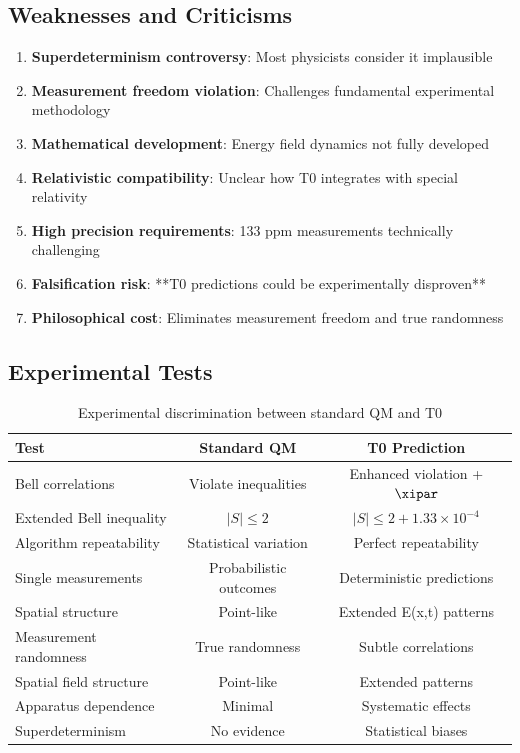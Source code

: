 	\subsection{Weaknesses and Criticisms}
	
	\begin{enumerate}
		\item \textbf{Superdeterminism controversy}: Most physicists consider it implausible
		\item \textbf{Measurement freedom violation}: Challenges fundamental experimental methodology
		\item \textbf{Mathematical development}: Energy field dynamics not fully developed
		\item \textbf{Relativistic compatibility}: Unclear how T0 integrates with special relativity
		\item \textbf{High precision requirements}: 133 ppm measurements technically challenging
		\item \textbf{Falsification risk}: **T0 predictions could be experimentally disproven**
		\item \textbf{Philosophical cost}: Eliminates measurement freedom and true randomness
	\end{enumerate}
	
	\subsection{Experimental Tests}
	
	\begin{table}[htbp]
		\centering
		\begin{tabular}{lcc}
			\toprule
			\textbf{Test} & \textbf{Standard QM} & \textbf{T0 Prediction} \\
			\midrule
			Bell correlations & Violate inequalities & Enhanced violation + $\xipar$ \\
			Extended Bell inequality & $|S| \leq 2$ & $|S| \leq 2 + 1.33 \times 10^{-4}$ \\
			Algorithm repeatability & Statistical variation & Perfect repeatability \\
			Single measurements & Probabilistic outcomes & Deterministic predictions \\
			Spatial structure & Point-like & Extended E(x,t) patterns \\
			Measurement randomness & True randomness & Subtle correlations \\
			Spatial field structure & Point-like & Extended patterns \\
			Apparatus dependence & Minimal & Systematic effects \\
			Superdeterminism & No evidence & Statistical biases \\
			\bottomrule
		\end{tabular}
		\caption{Experimental discrimination between standard QM and T0}
	\end{table}
	
